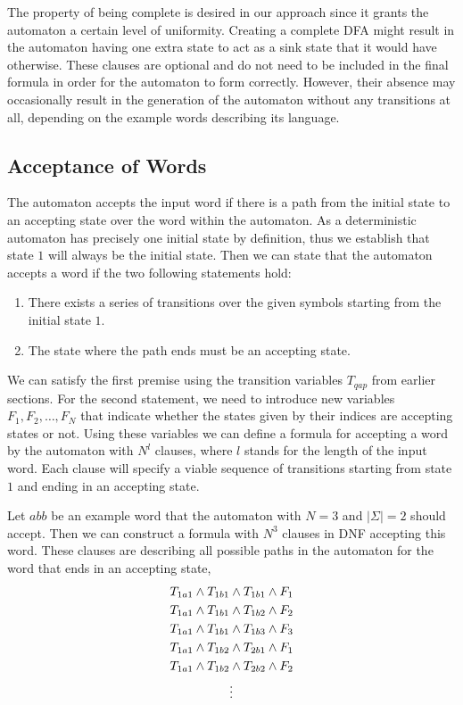 The property of being complete is desired in our approach since it grants the automaton a certain level of uniformity. Creating a complete DFA might result in the automaton having one extra state to act as a sink state that it would have otherwise. These clauses are optional and do not need to be included in the final formula in order for the automaton to form correctly. However, their absence may occasionally result in the generation of the automaton without any transitions at all, depending on the example words describing its language.

\subsection{Acceptance of Words}

The automaton accepts the input word if there is a path from the initial state to an accepting state over the word within the automaton. As a deterministic automaton has precisely one initial state by definition,  thus we establish that state $1$ will always be the initial state. Then we can state that the automaton accepts a word if the two following statements hold:

\begin{enumerate}
    \item There exists a series of transitions over the given symbols starting from the initial state $1$.
    \item The state where the path ends must be an accepting state.
\end{enumerate}

We can satisfy the first premise using the transition variables $T_{qap}$ from earlier sections. For the second statement, we need to introduce new variables $F_1, F_2,\dots, F_N$ that indicate whether the states given by their indices are accepting states or not. Using these variables we can define a formula for accepting a word by the automaton with $N^l$ clauses, where $l$ stands for the length of the input word. Each clause will specify a viable sequence of transitions starting from state $1$ and ending in an accepting state.

Let $abb$ be an example word that the automaton with $N=3$ and $|\Sigma|=2$ should accept. Then we can construct a formula with $N^3$ clauses in DNF accepting this word. These clauses are describing all possible paths in the automaton for the word that ends in an accepting state,
\begin{align*}
    \centering
    T_{1a1} \land T_{1b1} &\land T_{1b1} \land F_1 \\
    T_{1a1} \land T_{1b1} &\land T_{1b2} \land F_2 \\
    T_{1a1} \land T_{1b1} &\land T_{1b3} \land F_3 \\
    T_{1a1} \land T_{1b2} &\land T_{2b1} \land F_1 \\
    T_{1a1} \land T_{1b2} &\land T_{2b2} \land F_2 \\
    & \vdots \notag
\end{align*}

